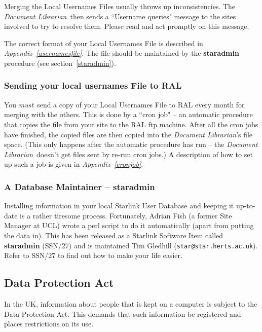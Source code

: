 \documentclass[twoside,11pt]{article}
\newcommand{\xref}[3]{#1}
\begin{document}
Merging the Local Usernames Files usually throws up inconsistencies.
The {\em Document Librarian}\, then sends a ``Username queries" message to the
sites involved to try to resolve them.
Please read and act promptly on this message.

The correct format of your Local Usernames File is described in
{\em Appendix~\ref{usernamesfile}}.
The file should be maintained by the {\bf staradmin} procedure
(see section~\ref{staradmin}).

\subsubsection{\label{SYLUF}Sending your local usernames File to RAL}

You {\em must}\, send a copy of your Local Usernames File to RAL every
month for merging with the others.
This is done by a ``cron job" -- an automatic procedure that copies the file
from your site to the RAL ftp machine.
After all the cron jobs have finished, the copied files are then copied into
the {\em Document Librarian}'s file space.
(This only happens after the automatic procedure has run -- the {\em Document
Librarian}\, doesn't get files sent by re-run cron jobs.)
A description of how to set up such a job is given in
{\em Appendix~\ref{cronjob}}.

\subsubsection{\label{staradmin}A Database Maintainer --  staradmin}

Installing information in your local Starlink User Database and keeping it
up-to-date is a rather tiresome process.
Fortunately, Adrian Fish (a former Site Manager at UCL) wrote a
perl script to do it automatically (apart from putting the data in).
This has been released as a Starlink Software Item called {\bf staradmin}
(SSN/27) and is maintained Tim Gledhill ({\tt star@star.herts.ac.uk}).
Refer to
\xref{SSN/27}{ssn27}{} to find out how to make your life easier.

\subsection{\label{DPA}Data Protection Act}

In the UK, information about people that is kept on a computer is subject to the
Data Protection Act.
This demands that such information be registered and places restrictions on its
use.
\end{document}
